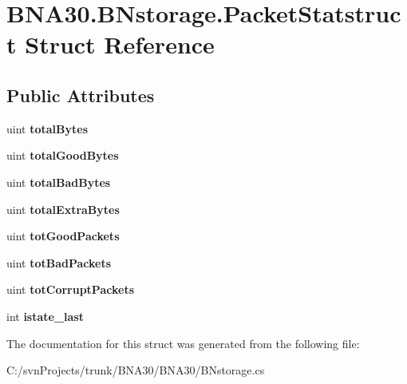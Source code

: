 \hypertarget{struct_b_n_a30_1_1_b_nstorage_1_1_packet_statstruct}{}\section{B\+N\+A30.\+B\+Nstorage.\+Packet\+Statstruct Struct Reference}
\label{struct_b_n_a30_1_1_b_nstorage_1_1_packet_statstruct}
\subsection*{Public Attributes}
\begin{DoxyCompactItemize}
\item 
\mbox{\label{struct_b_n_a30_1_1_b_nstorage_1_1_packet_statstruct_abd3f19acbafcc5050836b1999217c640}} 
uint {\bfseries total\+Bytes}
\item 
\mbox{\label{struct_b_n_a30_1_1_b_nstorage_1_1_packet_statstruct_a3ffbe9175b03480ed0e082287c87606e}} 
uint {\bfseries total\+Good\+Bytes}
\item 
\mbox{\label{struct_b_n_a30_1_1_b_nstorage_1_1_packet_statstruct_acdff38f42cd8540ea3d9d41fdae6157b}} 
uint {\bfseries total\+Bad\+Bytes}
\item 
\mbox{\label{struct_b_n_a30_1_1_b_nstorage_1_1_packet_statstruct_ade063b634c9fd7cec233d75d9d83522a}} 
uint {\bfseries total\+Extra\+Bytes}
\item 
\mbox{\label{struct_b_n_a30_1_1_b_nstorage_1_1_packet_statstruct_a5fd56802fb36e7ed22c240c601ee13d2}} 
uint {\bfseries tot\+Good\+Packets}
\item 
\mbox{\label{struct_b_n_a30_1_1_b_nstorage_1_1_packet_statstruct_a7528c2ee0703bef8da379a0247287510}} 
uint {\bfseries tot\+Bad\+Packets}
\item 
\mbox{\label{struct_b_n_a30_1_1_b_nstorage_1_1_packet_statstruct_a06a1a14a308a5403d36cb32b73d79e2d}} 
uint {\bfseries tot\+Corrupt\+Packets}
\item 
\mbox{\label{struct_b_n_a30_1_1_b_nstorage_1_1_packet_statstruct_ab8fd26f10a81339ce689ddbb347d3fdc}} 
int {\bfseries istate\+\_\+last}
\end{DoxyCompactItemize}


The documentation for this struct was generated from the following file\+:\begin{DoxyCompactItemize}
\item 
C\+:/svn\+Projects/trunk/\+B\+N\+A30/\+B\+N\+A30/B\+Nstorage.\+cs\end{DoxyCompactItemize}
